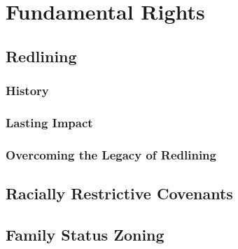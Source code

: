 \chapter{Fundamental Rights}

\section{Redlining}

\subsection{History}



\subsection{Lasting Impact}



\subsection{Overcoming the Legacy of Redlining}







\section{Racially Restrictive Covenants}




\begin{questions}

\end{questions}

\section{Family Status Zoning}






\begin{questions}

\end{questions}

